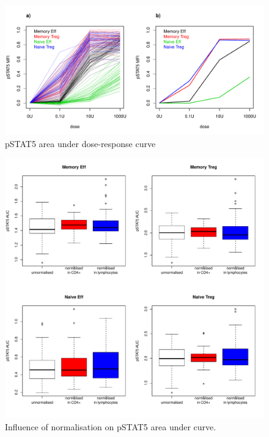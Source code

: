 \begin{figure}[h]
    \centering
    \includegraphics[scale=.5]{IL2/figures/pstat5-auc-celltypes.pdf}
    { pSTAT5 area under dose-response curve }
    { }
\end{figure}

\begin{figure}[h]
    \centering
    \includegraphics[scale=.5]{IL2/figures/pstat5-auc-boxplots-celltypes.pdf}
    { Influence of normalisation on pSTAT5 area under curve. }
    { }
\end{figure}



